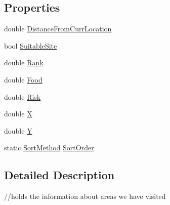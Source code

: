 \subsection*{Properties}
\begin{DoxyCompactItemize}
\item 
double \hyperlink{class_p_a_z___dispersal_1_1_eligible_home_site_a67cce2b69dfdc9a68ca13b6e1e07f146}{Distance\-From\-Curr\-Location}
\item 
bool \hyperlink{class_p_a_z___dispersal_1_1_eligible_home_site_af7b0633826dcd2040587b0d165af7976}{Suitable\-Site}
\item 
double \hyperlink{class_p_a_z___dispersal_1_1_eligible_home_site_a7ed18a51c8734cd2cd71b7a2a649df49}{Rank}
\item 
double \hyperlink{class_p_a_z___dispersal_1_1_eligible_home_site_a612332adaaa8c0069b73503b7de570b4}{Food}
\item 
double \hyperlink{class_p_a_z___dispersal_1_1_eligible_home_site_a3945e6ec67860a5ea2d2edcac1c15ea5}{Risk}
\item 
double \hyperlink{class_p_a_z___dispersal_1_1_eligible_home_site_a9fc71f1593c754b275bdd07132fe842a}{X}
\item 
double \hyperlink{class_p_a_z___dispersal_1_1_eligible_home_site_a2f8047d8156fb5253c676b66b96f59b9}{Y}
\item 
static \hyperlink{class_p_a_z___dispersal_1_1_eligible_home_site_a932acc387cf74015c8ca583f18c598dd}{Sort\-Method} \hyperlink{class_p_a_z___dispersal_1_1_eligible_home_site_a2d178f9059c08077fcc1221e125caef1}{Sort\-Order}
\end{DoxyCompactItemize}


\subsection{Detailed Description}
//holds the information about areas we have visited 



